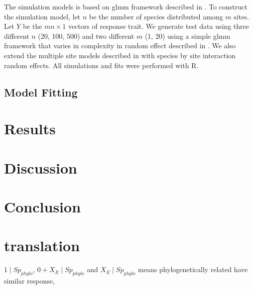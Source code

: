The simulation models is based on glmm framework described in .   
To construct the simulation model, let $n$ be the number of species distributed among $m$ sites.
Let $Y$ be the $mn \times 1$ vectors of response trait.  
We generate test data using three different $n$ (20, 100, 500) and two different $m$ (1, 20) using a simple glmm framework that varies in complexity in random effect described in . 
We also extend the multiple site models described in  with species by site interaction random effects. 
All simulations and fits were performed with R. 

\subsection{Model Fitting}



\section{Results}



\section{Discussion}
\section{Conclusion}
\newpage
\section{translation}

$1 \mid Sp_{phylo}$, $0 + X_{E} \mid Sp_{phylo}$ and $X_{E} \mid Sp_{phylo}$ means phylogenetically related have similar response,   

